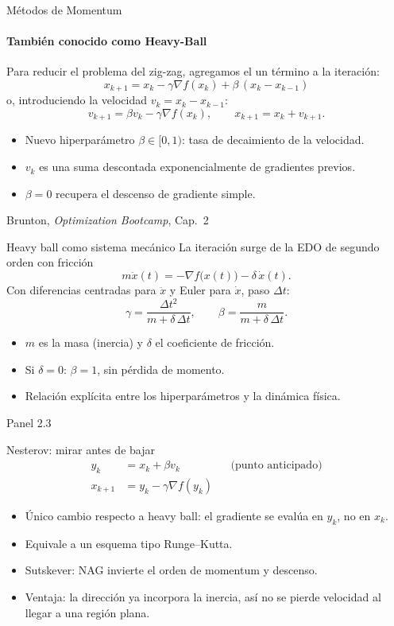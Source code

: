 \documentclass[10pt,aspectratio=169]{beamer}
\newcommand{\fuente}{\vfill{\scriptsize\color{gray}Brunton, \emph{Optimization Bootcamp}, Cap.~2}}
\begin{document}
\begin{frame}{Métodos de Momentum}
    \framesubtitle{También conocido como Heavy-Ball}
    Para reducir el problema del zig-zag, agregamos el un término a la iteración:
  \small
  \[
    \boxed{\;x_{k+1}=x_k-\gamma\nabla f(x_k)+\beta\,(x_k-x_{k-1})\;}
  \]
  o, introduciendo la velocidad $v_k=x_k-x_{k-1}$:
  \[
    v_{k+1}=\beta v_k-\gamma\nabla f(x_k),
    \qquad
    x_{k+1}=x_k+v_{k+1}.
  \]
  \begin{itemize}
    \item Nuevo hiperparámetro $\beta\in[0,1)$: tasa de decaimiento de la velocidad.
    \item $v_k$ es una suma descontada exponencialmente de gradientes previos.
    \item $\beta=0$ recupera el descenso de gradiente simple.
  \end{itemize}
  \fuente
\end{frame}

\begin{frame}{Heavy ball como sistema mecánico}
  \small
  La iteración surge de la EDO de segundo orden con fricción
  \[
    m\ddot x(t)=-\nabla f\big(x(t)\big)-\delta\,\dot x(t).
  \]
  Con diferencias centradas para $\ddot x$ y Euler para $\dot x$, paso $\Delta t$:
  \[
    \gamma=\frac{\Delta t^{2}}{m+\delta\,\Delta t},
    \qquad
    \beta=\frac{m}{m+\delta\,\Delta t}.
  \]
  \begin{itemize}
    \item $m$ es la masa (inercia) y $\delta$ el coeficiente de fricción.
    \item Si $\delta=0$: $\beta=1$, sin pérdida de momento.
    \item Relación explícita entre los hiperparámetros y la dinámica física.
  \end{itemize}
  \vfill
  {\scriptsize\color{gray}Panel 2.3}
\end{frame}

\begin{frame}{Nesterov: mirar antes de bajar}
  \small
  \[
    \boxed{
      \begin{aligned}
      y_k&=x_k+\beta v_k &&\text{(punto anticipado)}\\
      x_{k+1}&=y_k-\gamma\nabla f(y_k)
      \end{aligned}}
  \]
  \begin{itemize}
    \item Único cambio respecto a heavy ball: el gradiente se evalúa en $y_k$, no en $x_k$.
    \item Equivale a un esquema tipo Runge--Kutta.
    \item Sutskever: NAG invierte el orden de momentum y descenso.
    \item Ventaja: la dirección ya incorpora la inercia, así no se pierde
      velocidad al llegar a una región plana.
  \end{itemize}
\end{frame}
\end{document}
